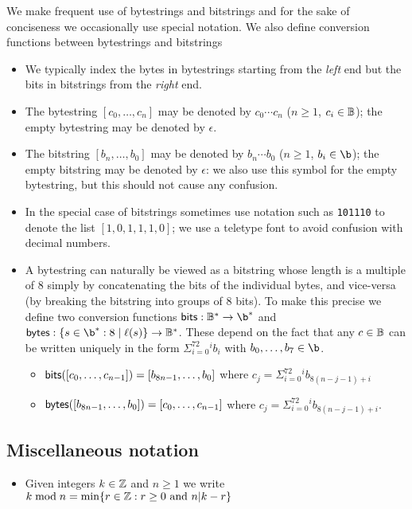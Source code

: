 We make frequent use of bytestrings and bitstrings and for the sake of
conciseness we occasionally use special notation.  We also define conversion
functions between bytestrings and bitstrings

\begin{itemize}
\item We typically index the bytes in bytestrings starting from the
  \textit{left} end but the bits in bitstrings from the \textit{right} end.

\item The bytestring $[c_0, \ldots, c_n]$ may be denoted by $c_0{\cdots}c_n$ ($n
  \geq 1$, $c_i \in \mathbb{B}$);  the empty bytestring may be denoted by $\epsilon$.

\item The bitstring $[b_n, \ldots, b_0]$ may be denoted by $b_n{\cdots}b_0$ ($n
  \geq 1$, $b_i \in \b$); the empty bitstring may be denoted by $\epsilon$: we
  also use this symbol for the empty bytestring, but this should not cause any
  confusion.

\item In the special case of bitstrings sometimes use notation such as
  \texttt{101110} to denote the list $[1,0,1,1,1,0]$; we use a teletype font to
  avoid confusion with decimal numbers.

\item A bytestring can naturally be viewed as a bitstring whose length is a
  multiple of 8 simply by concatenating the bits of the individual bytes, and
  vice-versa (by breaking the bitstring into groups of 8 bits).  To make this
  precise we define two conversion functions $\bitsof: \B^* \rightarrow \b^*$
  and $\bytesof: \{s \in \b^* : 8 \mid \length(s)\} \rightarrow \B^*$.  These
  depend on the fact that any $c \in \mathbb{B}$ can be written uniquely in the form
  $\Sigma_{i=0}^72^ib_i$ with $b_0, \ldots, b_7 \in \b$.
  \begin{itemize}
    \item $\mathsf{bits}([c_0, \ldots, c_{n-1}]) = [b_{8n-1}, \ldots, b_0]$ where $c_j=\Sigma_{i=0}^72^ib_{8(n-j-1)+i}$
    \item $\mathsf{bytes}([b_{8n-1}, \ldots, b_0]) = [c_0, \ldots, c_{n-1}]$ where $c_j=\Sigma_{i=0}^72^ib_{8(n-j-1)+i}$.
  \end{itemize}
\end{itemize}

\subsection{Miscellaneous notation}
\begin{itemize}
\item Given integers $k \in \mathbb{Z}$ and $n \geq 1$ we write $k \bmod n = \min\{r \in \mathbb{Z}: r \geq 0 \text{ and } n | k - r \}$
\end{itemize}


